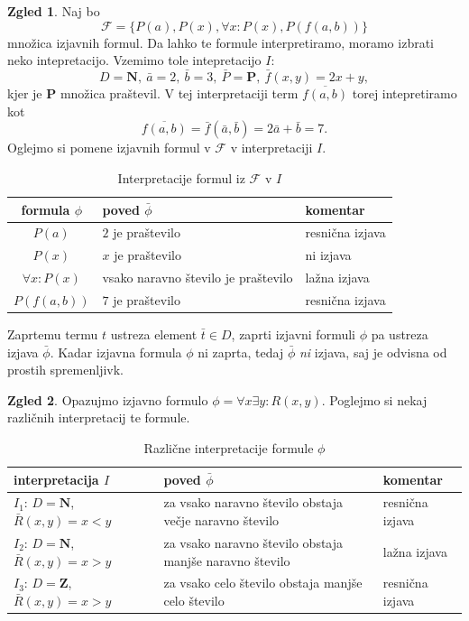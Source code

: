 \documentclass[11pt]{book}
\def\NN{\mathbf{N}}
\def\ZZ{\mathbf{Z}}
\def\Fcal{\mathcal{F}}
\def\PP{\mathbf{P}}
\theoremstyle{definition}
\theoremstyle{zgled}
\newtheorem*{zgled}{Zgled}
\theoremstyle{odprtproblem}
\theoremstyle{domacanaloga}
\theoremstyle{izrek}
\begin{document}
\begin{zgled}
Naj bo
\[
    \Fcal = \{ P(a), P(x), \forall x \colon P(x), P(f(a,b)) \}
\]
množica izjavnih formul. Da lahko te formule interpretiramo, moramo izbrati neko intepretacijo. Vzemimo tole intepretacijo $I$:
\[
    D = \NN, \ \bar a = 2, \ \bar b = 3, \ \bar P = \PP, \ \bar f(x,y) = 2x + y,
\] 
kjer je $\PP$ množica praštevil. V tej interpretaciji term $\overline{f(a,b)}$ torej intepretiramo kot
\[
    \overline{f(a,b)}
    = \bar f (\bar a, \bar b)
    = 2 \bar a + \bar b
    = 7.
\]
Oglejmo si pomene izjavnih formul v $\Fcal$ v interpretaciji $I$.

\begin{table}[h]
    \centering
    \begin{tabular}{cll}
        formula $\phi$ & poved $\bar \phi$ & komentar \\ \hline
        $P(a)$ & $2$ je praštevilo & resnična izjava \\
        $P(x)$ & $x$ je praštevilo & ni izjava \\
        $\forall x \colon P(x)$ & vsako naravno število je praštevilo & lažna izjava \\
        $P(f(a,b))$ & $7$ je praštevilo & resnična izjava
    \end{tabular}
    \caption{Interpretacije formul iz $\Fcal$ v $I$}
\end{table}
\end{zgled}

Zaprtemu termu $t$ ustreza element $\bar t \in D$, zaprti izjavni formuli $\phi$ pa ustreza izjava $\bar \phi$. Kadar izjavna formula $\phi$ ni zaprta, tedaj $\bar \phi$ \emph{ni} izjava, saj je odvisna od prostih spremenljivk.

\begin{zgled}
Opazujmo izjavno formulo $\phi = \forall x \exists y \colon R(x,y)$. Poglejmo si nekaj različnih interpretacij te formule.

\begin{table}[h]
    \centering
    \begin{tabular}{lll}
        interpretacija $I$ & poved $\bar \phi$ & komentar \\ \hline
        $I_1$: $D = \NN$, $\bar R(x,y) = x < y$ & za vsako naravno število obstaja večje naravno število & resnična izjava \\
        $I_2$: $D = \NN$, $\bar R(x,y) = x > y$ & za vsako naravno število obstaja manjše naravno število & lažna izjava \\
        $I_3$: $D = \ZZ$, $\bar R(x,y) = x > y$ & za vsako celo število obstaja manjše celo število & resnična izjava
    \end{tabular}
    \caption{Različne interpretacije formule $\phi$}
\end{table}
\end{zgled}
\end{document}
